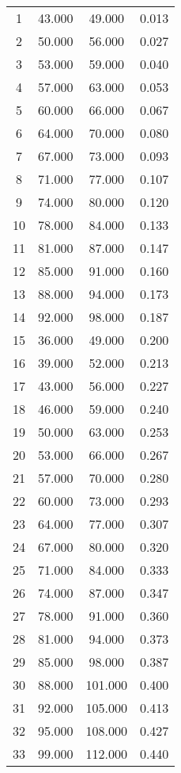 % 
\begin{tabular}{cccc}
  \hline
  \hline
1 & 43.000 & 49.000 & 0.013 \\ 
  2 & 50.000 & 56.000 & 0.027 \\ 
  3 & 53.000 & 59.000 & 0.040 \\ 
  4 & 57.000 & 63.000 & 0.053 \\ 
  5 & 60.000 & 66.000 & 0.067 \\ 
  6 & 64.000 & 70.000 & 0.080 \\ 
  7 & 67.000 & 73.000 & 0.093 \\ 
  8 & 71.000 & 77.000 & 0.107 \\ 
  9 & 74.000 & 80.000 & 0.120 \\ 
  10 & 78.000 & 84.000 & 0.133 \\ 
  11 & 81.000 & 87.000 & 0.147 \\ 
  12 & 85.000 & 91.000 & 0.160 \\ 
  13 & 88.000 & 94.000 & 0.173 \\ 
  14 & 92.000 & 98.000 & 0.187 \\ 
  15 & 36.000 & 49.000 & 0.200 \\ 
  16 & 39.000 & 52.000 & 0.213 \\ 
  17 & 43.000 & 56.000 & 0.227 \\ 
  18 & 46.000 & 59.000 & 0.240 \\ 
  19 & 50.000 & 63.000 & 0.253 \\ 
  20 & 53.000 & 66.000 & 0.267 \\ 
  21 & 57.000 & 70.000 & 0.280 \\ 
  22 & 60.000 & 73.000 & 0.293 \\ 
  23 & 64.000 & 77.000 & 0.307 \\ 
  24 & 67.000 & 80.000 & 0.320 \\ 
  25 & 71.000 & 84.000 & 0.333 \\ 
  26 & 74.000 & 87.000 & 0.347 \\ 
  27 & 78.000 & 91.000 & 0.360 \\ 
  28 & 81.000 & 94.000 & 0.373 \\ 
  29 & 85.000 & 98.000 & 0.387 \\ 
  30 & 88.000 & 101.000 & 0.400 \\ 
  31 & 92.000 & 105.000 & 0.413 \\ 
  32 & 95.000 & 108.000 & 0.427 \\ 
  33 & 99.000 & 112.000 & 0.440 \\ 

\end{tabular}
